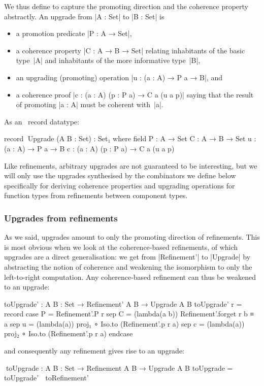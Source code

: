 We thus define  to capture the promoting direction and the coherence property abstractly.
An upgrade from |A : Set| to |B : Set| is
\begin{itemize}
\item a promotion predicate |P : A → Set|,
\item a coherence property |C : A → B → Set| relating inhabitants of the basic type~|A| and inhabitants of the more informative type~|B|,
\item an upgrading (promoting) operation |u : (a : A) → P a → B|, and
\item a coherence proof |c : (a : A) (p : P a) → C a (u a p)| saying that the result of promoting |a : A| must be coherent with~|a|.
\end{itemize}
As an \Agda\ record datatype:
\begin{code}
record ^^^Upgrade (A B : Set) : Set₁ where
  field
    P  :  A → Set
    C  :  A → B → Set
    u  :  (a : A) → P a → B
    c  :  (a : A) (p : P a) → C a (u a p)
\end{code}
Like refinements, arbitrary upgrades are not guaranteed to be interesting, but we will only use the upgrades synthesised by the combinators we define below specifically for deriving coherence properties and upgrading operations for function types from refinements between component types.

\subsubsection{Upgrades from refinements}

As we said, upgrades amount to only the promoting direction of refinements.
This is most obvious when we look at the coherence-based refinements, of which upgrades are a direct generalisation: we get from |Refinement'| to |Upgrade| by abstracting the notion of coherence and weakening the isomorphism to only the left-to-right computation.
Any coherence-based refinement can thus be weakened to an upgrade:
\begin{code}
toUpgrade' : {A B : Set} → Refinement' A B → Upgrade A B
toUpgrade' r = record  case  P  =  Refinement'.P r
                       sep   C  =  (lambda(a b)) Refinement'.forget r b ≡ a
                       sep   u  =  (lambda(a)) proj₁  ∘ Iso.to (Refinement'.p r a)
                       sep   c  =  (lambda(a)) proj₂  ∘ Iso.to (Refinement'.p r a) endcase
\end{code}
and consequently any refinement gives rise to an upgrade:
\begin{code}
^^^toUpgrade : {A B : Set} → Refinement A B → Upgrade A B
toUpgrade = toUpgrade' ∘ toRefinement'
\end{code}

